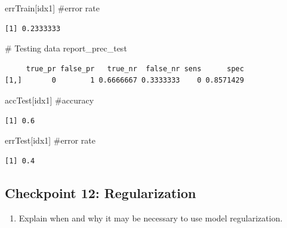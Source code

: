 \documentclass[
  letterpaper,
  DIV=11,
  numbers=noendperiod]{scrartcl}
\newenvironment{Shaded}{\begin{snugshade}}{\end{snugshade}}
\newcommand{\CommentTok}[1]{\textcolor[rgb]{0.37,0.37,0.37}{#1}}
\newcommand{\NormalTok}[1]{\textcolor[rgb]{0.00,0.23,0.31}{#1}}
\providecommand{\tightlist}{%
  \setlength{\itemsep}{0pt}\setlength{\parskip}{0pt}}\usepackage{longtable,booktabs,array}
\begin{document}
\begin{Shaded}
\begin{Highlighting}[]
\NormalTok{errTrain[idx1] }\CommentTok{\#error rate}
\end{Highlighting}
\end{Shaded}

\begin{verbatim}
[1] 0.2333333
\end{verbatim}

\begin{Shaded}
\begin{Highlighting}[]
\CommentTok{\# Testing data}
\NormalTok{report\_prec\_test}
\end{Highlighting}
\end{Shaded}

\begin{verbatim}
     true_pr false_pr   true_nr  false_nr sens      spec
[1,]       0        1 0.6666667 0.3333333    0 0.8571429
\end{verbatim}

\begin{Shaded}
\begin{Highlighting}[]
\NormalTok{accTest[idx1] }\CommentTok{\#accuracy}
\end{Highlighting}
\end{Shaded}

\begin{verbatim}
[1] 0.6
\end{verbatim}

\begin{Shaded}
\begin{Highlighting}[]
\NormalTok{errTest[idx1] }\CommentTok{\#error rate}
\end{Highlighting}
\end{Shaded}

\begin{verbatim}
[1] 0.4
\end{verbatim}

\hypertarget{checkpoint-12-regularization}{%
\subsection{Checkpoint 12:
Regularization}\label{checkpoint-12-regularization}}

\begin{enumerate}
\def\labelenumi{(\alph{enumi})}
\tightlist
\item
  Explain when and why it may be necessary to use model regularization.
\end{enumerate}
\end{document}
